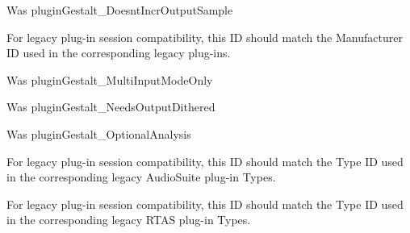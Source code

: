 \begin{DoxyRefList}
%
 Was plugin\+Gestalt\+\_\+\+Doesnt\+Incr\+Output\+Sample  
\item[Member \mbox{\hyperlink{a00737_a13e384f22825afd3db6d68395b79ce0da996465cca29a2a15291d1c788ac5728c}{AAX\+\_\+e\+Property\+\_\+\+Manufacturer\+ID}} ]\label{a00880__porting_notes000041}%
%
 For legacy plug-\/in session compatibility, this ID should match the Manufacturer ID used in the corresponding legacy plug-\/ins.  
\item[Member \mbox{\hyperlink{a00737_a13e384f22825afd3db6d68395b79ce0daa15cf3edd899af4a98fa18fcdfdeb9d6}{AAX\+\_\+e\+Property\+\_\+\+Multi\+Input\+Mode\+Only}} ]\label{a00880__porting_notes000054}%
%
 Was plugin\+Gestalt\+\_\+\+Multi\+Input\+Mode\+Only  
\item[Member \mbox{\hyperlink{a00737_a13e384f22825afd3db6d68395b79ce0da38a26f7d914d391cef1f71acfb98a2ec}{AAX\+\_\+e\+Property\+\_\+\+Needs\+Output\+Dithered}} ]\label{a00880__porting_notes000057}%
%
 Was plugin\+Gestalt\+\_\+\+Needs\+Output\+Dithered  
\item[Member \mbox{\hyperlink{a00737_a13e384f22825afd3db6d68395b79ce0da5a2bacb421fc36f890a121f01a9e72ba}{AAX\+\_\+e\+Property\+\_\+\+Optional\+Analysis}} ]\label{a00880__porting_notes000049}%
%
 Was plugin\+Gestalt\+\_\+\+Optional\+Analysis  
\item[Member \mbox{\hyperlink{a00737_a13e384f22825afd3db6d68395b79ce0dad3344696b8298a8b254add3d039ea927}{AAX\+\_\+e\+Property\+\_\+\+Plug\+In\+ID\+\_\+\+Audio\+Suite}} ]\label{a00880__porting_notes000044}%
%
 For legacy plug-\/in session compatibility, this ID should match the Type ID used in the corresponding legacy Audio\+Suite plug-\/in Types.  
\item[Member \mbox{\hyperlink{a00737_a13e384f22825afd3db6d68395b79ce0da89ca3dd6e96895cda14976c1b1ceb826}{AAX\+\_\+e\+Property\+\_\+\+Plug\+In\+ID\+\_\+\+Native}} ]\label{a00880__porting_notes000043}%
%
 For legacy plug-\/in session compatibility, this ID should match the Type ID used in the corresponding legacy RTAS plug-\/in Types.  
\item[Member \mbox{\hyperlink{a00737_a13e384f22825afd3db6d68395b79ce0da75f174df4efbeca86eaada126c1d9214}{AAX\+\_\+e\+Property\+\_\+\+Plug\+In\+ID\+\_\+\+TI}} ]\label{a00880__porting_notes000045}%
%

\end{DoxyRefList}
